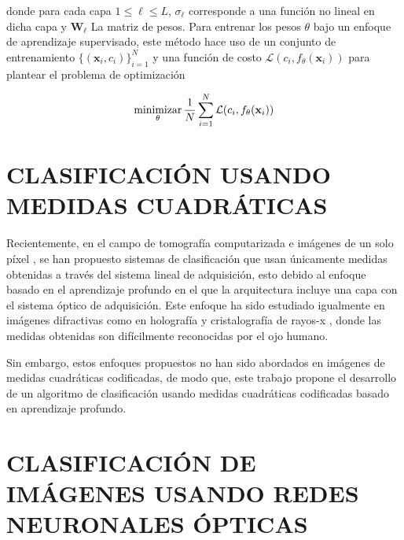 donde para cada capa $1 \leq \ell \leq L$, $\sigma_\ell$ corresponde a una función no lineal en dicha capa y $\mathbf{W}_\ell$ La matriz de pesos. Para entrenar los pesos $\theta$ bajo un enfoque de aprendizaje supervisado, este método hace uso de un conjunto de entrenamiento $\{(\mathbf{x}_i, c_i) \}_{i=1}^{N}$ y una función de costo $\mathcal{L}( c_i,  f_\theta(\mathbf{x}_i))$ para plantear el problema de optimización 

\begin{equation}
    \operatorname*{minimizar}_\theta \frac{1}{N}\sum_{i=1}^{N} \mathcal{L}( c_i,  f_\theta(\mathbf{x}_i))
    \label{eq:optimización_nn}
\end{equation}

\section{CLASIFICACIÓN USANDO MEDIDAS CUADRÁTICAS}
Recientemente, en el campo de tomografía computarizada  e imágenes de un solo píxel , se han propuesto sistemas de clasificación que usan únicamente medidas obtenidas a través del sistema lineal de adquisición, esto debido al enfoque basado en el aprendizaje profundo en el que la arquitectura incluye una capa con el sistema óptico de adquisición. Este enfoque ha sido estudiado igualmente en imágenes difractivas como en holografía  y cristalografía de rayos-x , donde las medidas obtenidas son difícilmente reconocidas por el ojo humano. 

Sin embargo, estos enfoques propuestos no han sido abordados en imágenes de medidas cuadráticas codificadas, de modo que, este trabajo propone el desarrollo de un algoritmo de clasificación usando medidas cuadráticas codificadas basado en aprendizaje profundo. 

\section{CLASIFICACIÓN DE IMÁGENES USANDO REDES NEURONALES ÓPTICAS}

